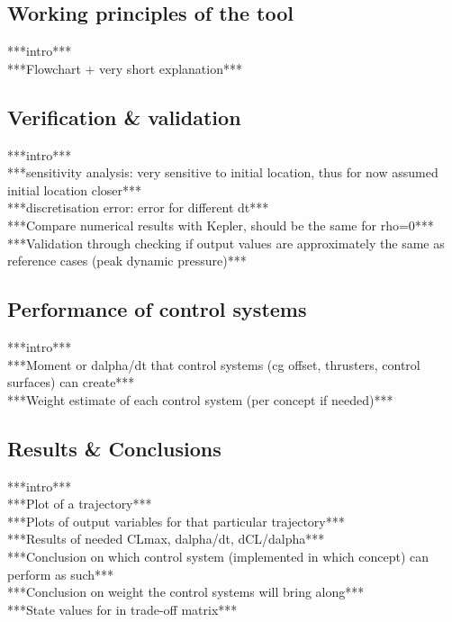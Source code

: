 \subsection{Working principles of the tool}
\label{sec:astrowp}
***intro***\\
***Flowchart + very short explanation***\\

\subsection{Verification \& validation}
\label{sec:astrovv}
***intro***\\
***sensitivity analysis: very sensitive to initial location, thus for now assumed initial location closer***\\
***discretisation error: error for different dt***\\
***Compare numerical results with Kepler, should be the same for rho=0***\\
***Validation through checking if output values are approximately the same as reference cases (peak dynamic pressure)***\\

\subsection{Performance of control systems}
 \label{sec:astroref}
***intro***\\
***Moment or dalpha/dt that control systems (cg offset, thrusters, control surfaces) can create***\\
***Weight estimate of each control system (per concept if needed)***\\

\subsection{Results \& Conclusions}
\label{sec:astrores}
***intro***\\
***Plot of a trajectory***\\
***Plots of output variables for that particular trajectory***\\
***Results of needed CLmax, dalpha/dt, dCL/dalpha***\\
***Conclusion on which control system (implemented in which concept) can perform as such***\\
***Conclusion on weight the control systems will bring along***\\
***State values for in trade-off matrix***\\